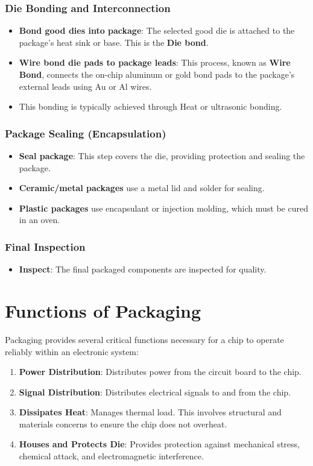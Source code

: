 \documentclass{report}
\begin{document}
\subsubsection{Die Bonding and Interconnection}
\begin{itemize}
    \item \textbf{Bond good dies into package}: The selected good die is attached to the package's heat sink or base. This is the \textbf{Die bond}.
    \item \textbf{Wire bond die pads to package leads}: This process, known as \textbf{Wire Bond}, connects the on-chip aluminum or gold bond pads to the package's external leads using Au or Al wires.
    \item This bonding is typically achieved through Heat or ultrasonic bonding.
\end{itemize}

\subsubsection{Package Sealing (Encapsulation)}
\begin{itemize}
    \item \textbf{Seal package}: This step covers the die, providing protection and sealing the package.
    \item \textbf{Ceramic/metal packages} use a metal lid and solder for sealing.
    \item \textbf{Plastic packages} use encapsulant or injection molding, which must be cured in an oven.
\end{itemize}

\subsubsection{Final Inspection}
\begin{itemize}
    \item \textbf{Inspect}: The final packaged components are inspected for quality.
\end{itemize}

\section{Functions of Packaging}

Packaging provides several critical functions necessary for a chip to operate reliably within an electronic system:

\begin{enumerate}
    \item \textbf{Power Distribution}: Distributes power from the circuit board to the chip.
    \item \textbf{Signal Distribution}: Distributes electrical signals to and from the chip.
    \item \textbf{Dissipates Heat}: Manages thermal load. This involves structural and materials concerns to ensure the chip does not overheat.
    \item \textbf{Houses and Protects Die}: Provides protection against mechanical stress, chemical attack, and electromagnetic interference.
\end{enumerate}
\end{document}
